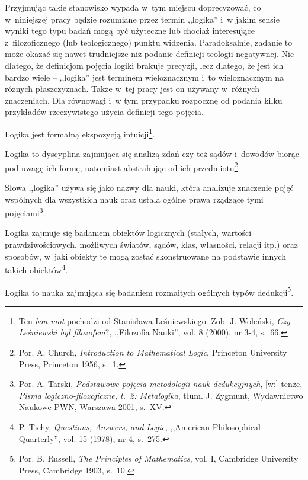 Przyjmując takie stanowisko wypada w~tym miejscu doprecyzować, co w~niniejszej pracy będzie rozumiane przez termin ,,logika'' i~w jakim sensie wyniki tego typu badań mogą być użyteczne lub chociaż interesujące z~filozoficznego (lub teologicznego) punktu widzenia. Paradoksalnie, zadanie to może okazać się nawet trudniejsze niż podanie definicji teologii negatywnej. Nie dlatego, że definicjom pojęcia logiki brakuje precyzji, lecz dlatego, że jest ich bardzo wiele -- ,,logika'' jest terminem wieloznacznym i~to wieloznacznym na różnych płaszczyznach. Także w~tej pracy jest on używany w~różnych znaczeniach. Dla równowagi i~w tym przypadku rozpocznę od podania kilku przykładów rzeczywistego użycia definicji tego pojęcia.


\begin{defin}
Logika jest formalną ekspozycją intuicji\footnote{Ten \textit{bon mot} pochodzi od Stanisława Leśniewskiego. Zob. J. Woleński, \textit{Czy Leśniewski był filozofem}?, ,,Filozofia Nauki'', vol. 8 (2000), nr 3-4, s.~66.}.
\end{defin}
\begin{defin}
Logika to dyscyplina zajmująca się analizą zdań czy też sądów i~dowodów biorąc pod uwagę ich formę, natomiast abstrahując od ich przedmiotu\footnote{Por. A. Church, \textit{Introduction to Mathematical Logic}, Princeton University Press,
Princeton
1956, s.~1.}.
\end{defin}
\begin{defin}
Słowa ,,logika'' używa się jako nazwy dla nauki, która analizuje znaczenie pojęć wspólnych dla wszystkich nauk oraz ustala ogólne prawa rządzące tymi pojęciami\footnote{Por. A. Tarski, \textit{Podstawowe pojęcia metodologii nauk dedukcyjnych}, [w:] tenże, \textit{Pisma logiczno-filozoficzne, t.~2: Metalogika}, tłum. J. Zygmunt, Wydawnictwo Naukowe PWN, Warszawa 2001, s.~XV.}.
\end{defin}
\begin{defin}
Logika zajmuje się badaniem obiektów logicznych (stałych, wartości prawdziwościowych, możliwych światów, sądów, klas, własności, relacji itp.) oraz sposobów, w~jaki obiekty te mogą zostać skonstruowane na podstawie innych takich obiektów\footnote{P. Tichy, \textit{Questions, Answers, and Logic}, ,,American Philosophical Quarterly'', vol. 15 (1978), nr 4, s.~275.}.
\end{defin}
\begin{defin}
Logika to nauka zajmująca się badaniem rozmaitych ogólnych typów dedukcji\footnote{Por. B. Russell, \textit{The Principles of Mathematics}, vol. I, Cambridge University Press, Cambridge 1903, s.~10.}.
\end{defin}


